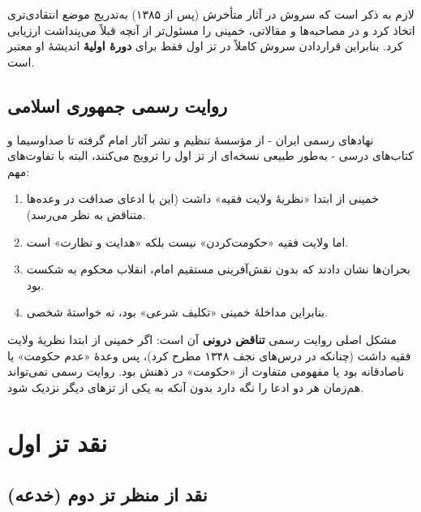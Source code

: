 \documentclass[12pt,a4paper]{book}
\newcommand{\keyword}[1]{\textbf{\textcolor{cPrimary}{#1}}}
\begin{document}
\begin{warningBox}
لازم به ذکر است که سروش در آثار متأخرش (پس از ۱۳۸۵) به‌تدریج موضع انتقادی‌تری اتخاذ کرد و در مصاحبه‌ها و مقالاتی، خمینی را مسئول‌تر از آنچه قبلاً می‌پنداشت ارزیابی کرد. بنابراین قراردادن سروش کاملاً در تز اول فقط برای \keyword{دورهٔ اولیهٔ} اندیشهٔ او معتبر است.
\end{warningBox}

\subsection{روایت رسمی جمهوری اسلامی}

نهادهای رسمی ایران - از مؤسسهٔ تنظیم و نشر آثار امام گرفته تا صداوسیما و کتاب‌های درسی - به‌طور طبیعی نسخه‌ای از تز اول را ترویج می‌کنند، البته با تفاوت‌های مهم:

\begin{principleBox}
\begin{enumerate}[label=\textcolor{cPrimary}{\arabic*.}, rightmargin=2em]
    \item خمینی از ابتدا «نظریهٔ ولایت فقیه» داشت (این با ادعای صداقت در وعده‌ها متناقض به نظر می‌رسد).
    \item اما ولایت فقیه «حکومت‌کردن» نیست بلکه «هدایت و نظارت» است.
    \item بحران‌ها نشان دادند که بدون نقش‌آفرینی مستقیم امام، انقلاب محکوم به شکست بود.
    \item بنابراین مداخلهٔ خمینی «تکلیف شرعی» بود، نه خواستهٔ شخصی.
\end{enumerate}
\end{principleBox}

\begin{warningBox}
مشکل اصلی روایت رسمی \keyword{تناقض درونی} آن است: اگر خمینی از ابتدا نظریهٔ ولایت فقیه داشت (چنانکه در درس‌های نجف ۱۳۴۸ مطرح کرد)، پس وعدهٔ «عدم حکومت» یا ناصادقانه بود یا مفهومی متفاوت از «حکومت» در ذهنش بود. روایت رسمی نمی‌تواند هم‌زمان هر دو ادعا را نگه دارد بدون آنکه به یکی از تزهای دیگر نزدیک شود.
\end{warningBox}

\section{نقد تز اول}

\subsection{نقد از منظر تز دوم (خدعه)}
\end{document}
